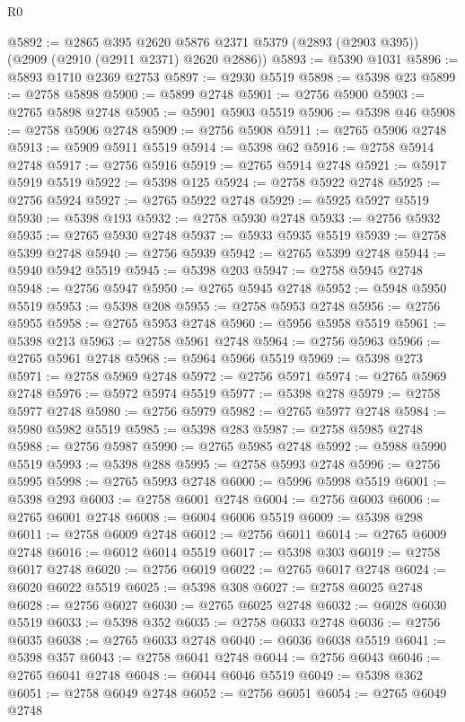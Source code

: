 \begin{lexlean}{R0}
\begin{coremodule}
@5892 := @2865
    @395
    @2620
    @5876
    @2371
    @5379
    (@2893 (@2903 @395))
    (@2909 (@2910 (@2911 @2371) @2620 @2886))
@5893 := @5390 @1031
@5896 := @5893 @1710 @2369 @2753
@5897 := @2930 @5519
@5898 := @5398 @23
@5899 := @2758 @5898
@5900 := @5899 @2748
@5901 := @2756 @5900
@5903 := @2765 @5898 @2748
@5905 := @5901 @5903 @5519
@5906 := @5398 @46
@5908 := @2758 @5906 @2748
@5909 := @2756 @5908
@5911 := @2765 @5906 @2748
@5913 := @5909 @5911 @5519
@5914 := @5398 @62
@5916 := @2758 @5914 @2748
@5917 := @2756 @5916
@5919 := @2765 @5914 @2748
@5921 := @5917 @5919 @5519
@5922 := @5398 @125
@5924 := @2758 @5922 @2748
@5925 := @2756 @5924
@5927 := @2765 @5922 @2748
@5929 := @5925 @5927 @5519
@5930 := @5398 @193
@5932 := @2758 @5930 @2748
@5933 := @2756 @5932
@5935 := @2765 @5930 @2748
@5937 := @5933 @5935 @5519
@5939 := @2758 @5399 @2748
@5940 := @2756 @5939
@5942 := @2765 @5399 @2748
@5944 := @5940 @5942 @5519
@5945 := @5398 @203
@5947 := @2758 @5945 @2748
@5948 := @2756 @5947
@5950 := @2765 @5945 @2748
@5952 := @5948 @5950 @5519
@5953 := @5398 @208
@5955 := @2758 @5953 @2748
@5956 := @2756 @5955
@5958 := @2765 @5953 @2748
@5960 := @5956 @5958 @5519
@5961 := @5398 @213
@5963 := @2758 @5961 @2748
@5964 := @2756 @5963
@5966 := @2765 @5961 @2748
@5968 := @5964 @5966 @5519
@5969 := @5398 @273
@5971 := @2758 @5969 @2748
@5972 := @2756 @5971
@5974 := @2765 @5969 @2748
@5976 := @5972 @5974 @5519
@5977 := @5398 @278
@5979 := @2758 @5977 @2748
@5980 := @2756 @5979
@5982 := @2765 @5977 @2748
@5984 := @5980 @5982 @5519
@5985 := @5398 @283
@5987 := @2758 @5985 @2748
@5988 := @2756 @5987
@5990 := @2765 @5985 @2748
@5992 := @5988 @5990 @5519
@5993 := @5398 @288
@5995 := @2758 @5993 @2748
@5996 := @2756 @5995
@5998 := @2765 @5993 @2748
@6000 := @5996 @5998 @5519
@6001 := @5398 @293
@6003 := @2758 @6001 @2748
@6004 := @2756 @6003
@6006 := @2765 @6001 @2748
@6008 := @6004 @6006 @5519
@6009 := @5398 @298
@6011 := @2758 @6009 @2748
@6012 := @2756 @6011
@6014 := @2765 @6009 @2748
@6016 := @6012 @6014 @5519
@6017 := @5398 @303
@6019 := @2758 @6017 @2748
@6020 := @2756 @6019
@6022 := @2765 @6017 @2748
@6024 := @6020 @6022 @5519
@6025 := @5398 @308
@6027 := @2758 @6025 @2748
@6028 := @2756 @6027
@6030 := @2765 @6025 @2748
@6032 := @6028 @6030 @5519
@6033 := @5398 @352
@6035 := @2758 @6033 @2748
@6036 := @2756 @6035
@6038 := @2765 @6033 @2748
@6040 := @6036 @6038 @5519
@6041 := @5398 @357
@6043 := @2758 @6041 @2748
@6044 := @2756 @6043
@6046 := @2765 @6041 @2748
@6048 := @6044 @6046 @5519
@6049 := @5398 @362
@6051 := @2758 @6049 @2748
@6052 := @2756 @6051
@6054 := @2765 @6049 @2748

\end{coremodule}
\end{lexlean}
